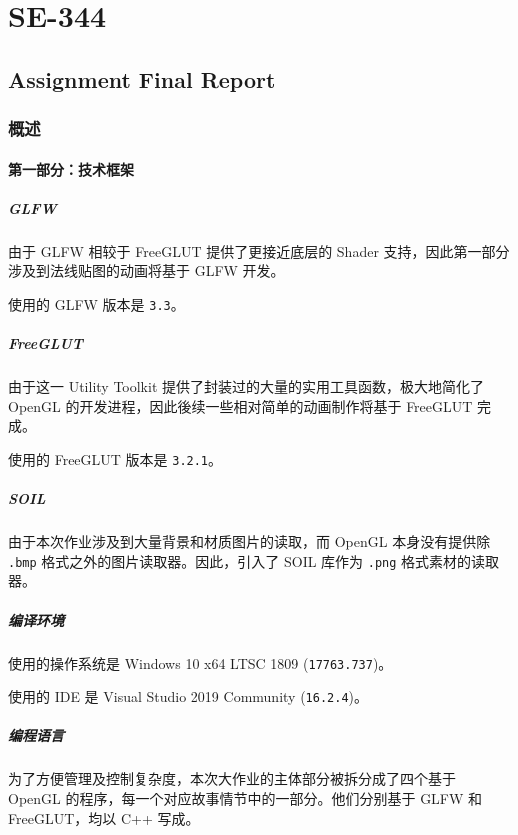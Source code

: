 \documentclass[
]{article}
\date{}
\begin{document}
\hypertarget{header-n0}{%
\section{SE-344}\label{header-n0}}

\hypertarget{header-n2}{%
\subsection{Assignment Final Report}\label{header-n2}}

\hypertarget{header-n3}{%
\subsubsection{概述}\label{header-n3}}

\hypertarget{header-n4}{%
\paragraph{第一部分：技术框架}\label{header-n4}}

\hypertarget{header-n5}{%
\subparagraph{GLFW}\label{header-n5}}

由于 GLFW 相较于 FreeGLUT 提供了更接近底层的 Shader
支持，因此第一部分涉及到法线贴图的动画将基于 GLFW 开发。

使用的 GLFW 版本是 \texttt{3.3}。

\hypertarget{header-n8}{%
\subparagraph{FreeGLUT}\label{header-n8}}

由于这一 Utility Toolkit 提供了封装过的大量的实用工具函数，极大地简化了
OpenGL 的开发进程，因此後续一些相对简单的动画制作将基于 FreeGLUT 完成。

使用的 FreeGLUT 版本是 \texttt{3.2.1}。

\hypertarget{header-n11}{%
\subparagraph{SOIL}\label{header-n11}}

由于本次作业涉及到大量背景和材质图片的读取，而 OpenGL 本身没有提供除
\texttt{.bmp} 格式之外的图片读取器。因此，引入了 SOIL 库作为
\texttt{.png} 格式素材的读取器。

\hypertarget{header-n13}{%
\subparagraph{编译环境}\label{header-n13}}

使用的操作系统是 Windows 10 x64 LTSC 1809 (\texttt{17763.737})。

使用的 IDE 是 Visual Studio 2019 Community (\texttt{16.2.4})。

\hypertarget{header-n16}{%
\subparagraph{编程语言}\label{header-n16}}

为了方便管理及控制复杂度，本次大作业的主体部分被拆分成了四个基于 OpenGL
的程序，每一个对应故事情节中的一部分。他们分别基于 GLFW 和
FreeGLUT，均以 C++ 写成。
\end{document}
